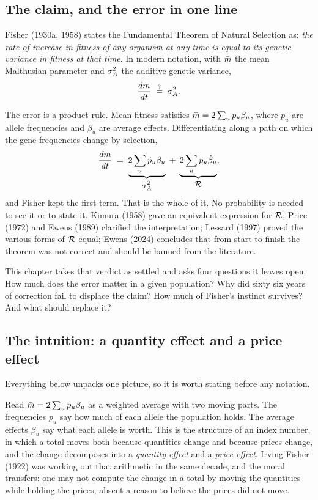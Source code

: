 \subsection{The claim, and the error in one line}

Fisher (1930a, 1958) states the Fundamental Theorem of Natural Selection as: \emph{the rate of
increase in fitness of any organism at any time is equal to its genetic variance in fitness at
that time}. In modern notation, with $\bar{m}$ the mean Malthusian parameter and $\sigma^{2}_{A}$ the additive
genetic variance,
\begin{equation}
\frac{d\bar{m}}{dt}\;\stackrel{?}{=}\;\sigma^{2}_{A} .
\label{ftns:eq:ftns}
\end{equation}

The error is a product rule. Mean fitness satisfies $\bar{m}=2\sum_up_u\beta_u$, where $p_u$ are
allele frequencies and $\beta_u$ are average effects. Differentiating along a path on which the gene frequencies change by selection,
\begin{equation}
\frac{d\bar{m}}{dt}\;=\;\underbrace{2\sum_u\dot p_u\beta_u}_{\displaystyle \sigma^{2}_{A}}
\;+\;\underbrace{2\sum_up_u\dot\beta_u}_{\displaystyle \mathcal{R}} ,
\label{ftns:eq:split}
\end{equation}
and Fisher kept the first term. That is the whole of it. No probability is needed to see it or to
state it. Kimura (1958) gave an equivalent expression for $\mathcal{R}$; Price (1972) and Ewens (1989)
clarified the interpretation; Lessard (1997) proved the various forms of $\mathcal{R}$ equal; Ewens (2024)
concludes that from start to finish the theorem was not correct and should be banned from the
literature.

This chapter takes that verdict as settled and asks four questions it leaves open. How much does
the error matter in a given population? Why did sixty six years of correction fail to displace the
claim? How much of Fisher's instinct survives? And what should replace it?

\subsection{The intuition: a quantity effect and a price effect}
\label{ftns:sec:index}

Everything below unpacks one picture, so it is worth stating before any notation.

Read $\bar{m}=2\sum_up_u\beta_u$ as a weighted average with two moving parts. The frequencies $p_u$
say how much of each allele the population holds. The average effects $\beta_u$ say what each
allele is worth. This is the structure of an index number, in which a total moves both because
quantities change and because prices change, and the change decomposes into a \emph{quantity
effect} and a \emph{price effect}. Irving Fisher (1922) was working out that arithmetic in the
same decade, and the moral transfers: one may not compute the change in a total by moving the
quantities while holding the prices, absent a reason to believe the prices did not move.

